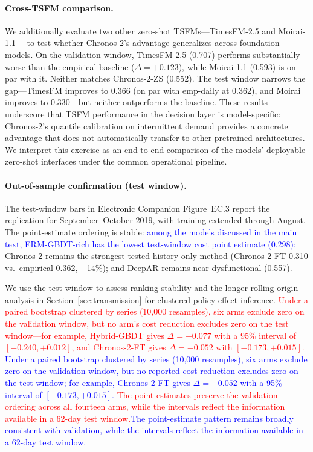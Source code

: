 \documentclass[msom,dblanonrev]{informs4}
\newcommand{\add}[1]{\textcolor{blue}{#1}}
\newcommand{\reduce}[1]{\textcolor{red}{#1}\hspace{0.5em}}
\begin{document}
\paragraph{Cross-TSFM comparison.}
We additionally evaluate two other zero-shot TSFMs---TimesFM-2.5 \citep{TimesFM2024} and Moirai-1.1 \citep{Moirai2024}---to test whether Chronos-2's advantage generalizes across foundation models.
On the validation window, TimesFM-2.5 (0.707) performs substantially worse than the empirical baseline ($\Delta = +0.123$), while Moirai-1.1 (0.593) is on par with it.
Neither matches Chronos-2-ZS (0.552).
The test window narrows the gap---TimesFM improves to 0.366 (on par with emp-daily at 0.362), and Moirai improves to 0.330---but neither outperforms the baseline.
These results underscore that TSFM performance in the decision layer is model-specific: Chronos-2's quantile calibration on intermittent demand provides a concrete advantage that does not automatically transfer to other pretrained architectures.
We interpret this exercise as an end-to-end comparison of the models' deployable zero-shot interfaces under the common operational pipeline.

\paragraph{Out-of-sample confirmation (test window).}
The test-window bars in Electronic Companion Figure~EC.3 report the replication for September--October 2019, with training extended through August.
The point-estimate ordering is stable:
\add{among the models discussed in the main text, ERM-GBDT-rich has the lowest test-window cost point estimate (0.298);}
Chronos-2 remains the strongest tested history-only method (Chronos-2-FT 0.310 vs.\ empirical 0.362, $-$14\%);
and DeepAR remains near-dysfunctional (0.557).

We use the test window to assess ranking stability and the longer rolling-origin analysis in Section~\ref{sec:transmission} for clustered policy-effect inference.
\reduce{Under a paired bootstrap clustered by series (10{,}000 resamples), six arms exclude zero on the validation window, but no arm's cost reduction excludes zero on the test window---for example, Hybrid-GBDT gives $\Delta = -0.077$ with a 95\% interval of $[-0.240, +0.012]$, and Chronos-2-FT gives $\Delta = -0.052$ with $[-0.173, +0.015]$.}
\add{Under a paired bootstrap clustered by series (10{,}000 resamples), six arms exclude zero on the validation window, but no reported cost reduction excludes zero on the test window; for example, Chronos-2-FT gives $\Delta = -0.052$ with a 95\% interval of $[-0.173, +0.015]$.}
\reduce{The point estimates preserve the validation ordering across all fourteen arms, while the intervals reflect the information available in a 62-day test window.}\add{The point-estimate pattern remains broadly consistent with validation, while the intervals reflect the information available in a 62-day test window.}
\end{document}
